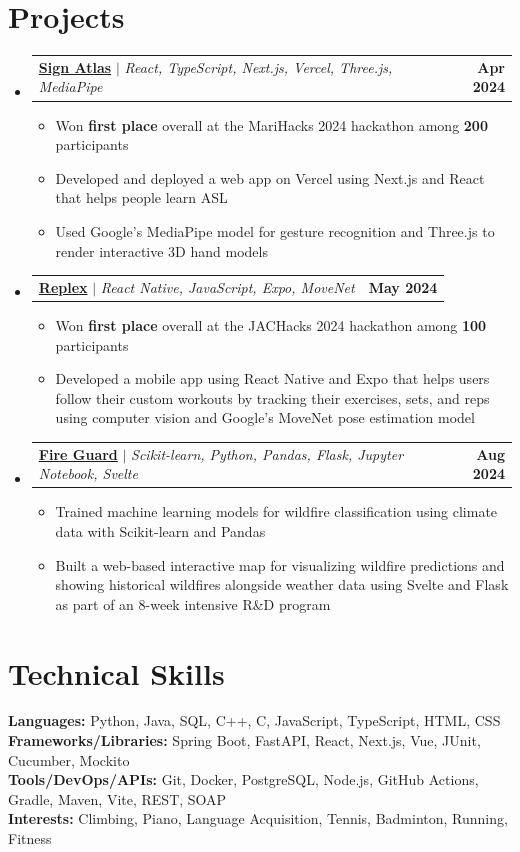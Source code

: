\documentclass[letterpaper,11pt]{article}
\makeatletter
\newcommand{\resumeItem}[1]{
  \item\small{
    {#1 \vspace{-2pt}}
  }
}
\newcommand{\resumeProjectHeading}[4]{
  \item
  \begin{tabular*}{\textwidth}{l@{\extracolsep{\fill}}r}
    \small{\href{#3}{\textbf{#1}\hspace{0.3em}{\faLink}} $|$ \emph{#2}} & \textbf{\small #4} \\
  \end{tabular*}\vspace{-7pt}
}
\newcommand{\resumeSubHeadingListStart}{\begin{itemize}[leftmargin=0in, label={}]}
\newcommand{\resumeSubHeadingListEnd}{\end{itemize}}
\newcommand{\resumeItemListStart}{\begin{itemize}}
\newcommand{\resumeItemListEnd}{\end{itemize}\vspace{-5pt}}
\makeatother
\begin{document}
\section{Projects}
    \resumeSubHeadingListStart
      \resumeProjectHeading
          {Sign Atlas}
          {React, TypeScript, Next.js, Vercel, Three.js, MediaPipe}
          {https://devpost.com/software/sign-atlas}
          {Apr 2024}
          \resumeItemListStart
            \resumeItem{Won \textbf{first place} overall at the MariHacks 2024 hackathon among \textbf{200} participants}
            \resumeItem{Developed and deployed a web app on Vercel using Next.js and React that helps people learn ASL}
            \resumeItem{Used Google's MediaPipe model for gesture recognition and Three.js to render interactive 3D hand models}
          \resumeItemListEnd
      \resumeProjectHeading
          {Replex}
          {React Native, JavaScript, Expo, MoveNet}
          {https://devpost.com/software/replex}
          {May 2024}
          \resumeItemListStart
            \resumeItem{Won \textbf{first place} overall at the JACHacks 2024 hackathon among \textbf{100} participants}
            \resumeItem{Developed a mobile app using React Native and Expo that helps users follow their custom workouts by tracking their exercises, sets, and reps using computer vision and Google's MoveNet pose estimation model}
          \resumeItemListEnd
      \resumeProjectHeading
          {Fire Guard}
          {Scikit-learn, Python, Pandas, Flask, Jupyter Notebook, Svelte}
          {https://github.com/tran-ethan/fire-guard}
          {Aug 2024}
          \resumeItemListStart
            \resumeItem{Trained machine learning models for wildfire classification using climate data with Scikit-learn and Pandas}
            \resumeItem{Built a web-based interactive map for visualizing wildfire predictions and showing historical wildfires alongside weather data using Svelte and Flask as part of an 8-week intensive R\&D program}
          \resumeItemListEnd
    \resumeSubHeadingListEnd

%
\section{Technical Skills}
 \begin{itemize}[leftmargin=0in, label={}]
    \small{\item{
     \textbf{Languages:}{ Python, Java, SQL, C++, C, JavaScript, TypeScript, HTML, CSS} \\
     \textbf{Frameworks/Libraries:}{ Spring Boot, FastAPI, React, Next.js, Vue, JUnit, Cucumber, Mockito} \\
     \textbf{Tools/DevOps/APIs:}{ Git, Docker, PostgreSQL, Node.js, GitHub Actions, Gradle, Maven, Vite, REST, SOAP } \\
     \textbf{Interests:}{ Climbing, Piano, Language Acquisition, Tennis, Badminton, Running, Fitness } \\
    }}
 \end{itemize}

\end{document}
